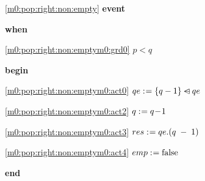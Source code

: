 \noindent \ref{m0:pop:right:non:empty}  \textbf{event}
\begin{block}
  \item   \textbf{when}
  \begin{block}
  \item[ \eqref{m0:pop:right:non:emptym0:grd0} ]$p < q $ %
  \end{block}
  \item   \textbf{begin}
  \begin{block}
  \item[ \eqref{m0:pop:right:non:emptym0:act0} ]$qe \mathrel{:\mkern1mu=} \{ q-1 \} \mathbin{\lhd\mkern-14mu-} qe $ %
  \item[ \eqref{m0:pop:right:non:emptym0:act2} ]$q \mathrel{:\mkern1mu=} q\! - \!1 $ %
  \item[ \eqref{m0:pop:right:non:emptym0:act3} ]$res \mathrel{:\mkern1mu=} qe.(q\; - \;1) $ %
  \item[ \eqref{m0:pop:right:non:emptym0:act4} ]$emp \mathrel{:\mkern1mu=} \text{false} $ %
  \end{block}
  \item   \textbf{end} \\
\end{block}
